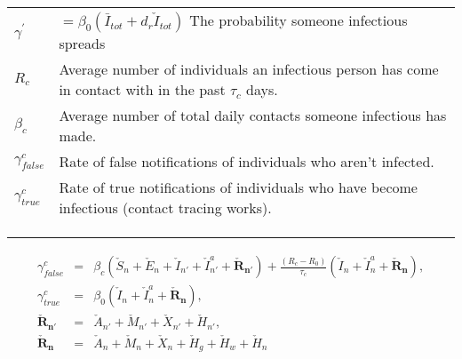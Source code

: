 \documentclass[notitlepage, superscriptaddress]{revtex4-2}
\begin{document}
\begin{table}[]
\begin{tabular}{ll}
$\gamma^{'}$                & $=\beta_{0} (\bar{I}_{tot} + d_{r} \check{I}_{tot})$  The probability someone infectious spreads      \\
$R_{c}$             & Average number of individuals an infectious person has come in contact with in the past $\tau_{c}$ days. \\
$\beta_{c}$                 & Average number of total daily contacts someone infectious has made.                                \\
$\gamma^{c}_{false}$        & Rate of false notifications of individuals who aren't infected.                                    \\
$\gamma^{c}_{true}$ & Rate of true notifications of individuals who have become infectious (contact tracing works).            \\
                            &                                                                                                    \\
                            &                                                                                                    \\
                            &                                                                                                   
\end{tabular}
\end{table}

\begin{eqnarray}
\gamma^{c}_{false} &=& \beta_{c} (\check{S}_{n} + \check{E}_{n} + \check{I}_{n'} + \check{I}^{a}_{n'} + \boldsymbol{\check{R}_{n'}}) + \frac{(R_{c}-R_{0})}{\tau_{c}}(\check{I}_{n} + \check{I}^{a}_{n} + \boldsymbol{\check{R}_{n}}), \\
%
\gamma^{c}_{true} &=& \beta_{0} (\check{I}_{n} + \check{I}^{a}_{n} + \boldsymbol{\check{R}_{n}}), \\ 
%
\boldsymbol{\check{R}_{n'}} &=& \check{A}_{n'} + \check{M}_{n'} + \check{X}_{n'} + \check{H}_{n'}, \\
%
\boldsymbol{\check{R}_{n}} &=& \check{A}_{n} + \check{M}_{n} + \check{X}_{n} + \check{H}_{g} + \check{H}_{w} + \check{H}_{n}
\end{eqnarray}
\end{document}
